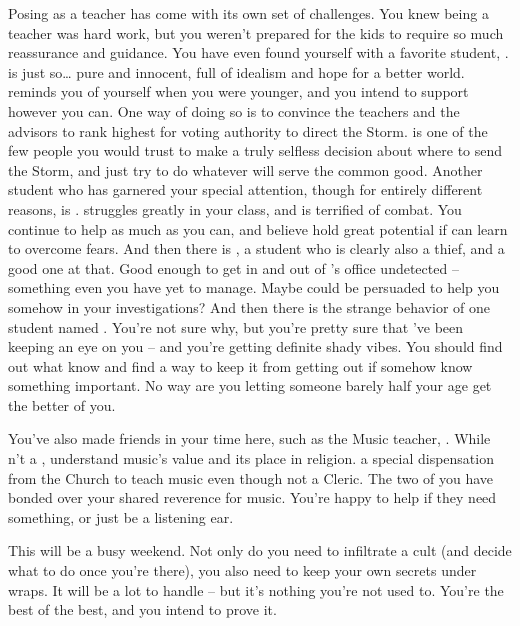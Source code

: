 \documentclass[char]{GL2020}
\begin{document}
Posing as a teacher has come with its own set of challenges. You knew being a teacher was hard work, but you weren't prepared for the kids to require so much reassurance and guidance. You have even found yourself with a favorite student, \cDisney{\full}. \cDisney{} is just so\ldots{} pure and innocent, full of idealism and hope for a better world. \cDisney{\They} reminds you of yourself when you were younger, and you intend to support \cDisney{\them} however you can. One way of doing so is to convince the \pTech{} teachers and the \pFarm{} advisors to rank \cDisney{} highest for voting authority to direct the Storm. \cDisney{} is one of the few people you would trust to make a truly selfless decision about where to send the Storm, and just try to do whatever will serve the common good. Another student who has garnered your special attention, though for entirely different reasons, is \cAdopted{\full}. \cAdopted{} struggles greatly in your class, and is terrified of combat. You continue to help \cAdopted{\them} as much as you can, and believe \cAdopted{\they} hold great potential if \cAdopted{\they} can learn to overcome \cAdopted{\their} fears. And then there is \cPirateChild{\full}, a student who is clearly also a thief, and a good one at that. Good enough to get in and out of \cChupInventor{}'s office undetected -- something even you have yet to manage. Maybe \cPirateChild{} could be persuaded to help you somehow in your investigations? And then there is the strange behavior of one \pFarm{} student named \cLibAssist{\full}. You're not sure why, but you're pretty sure that \cLibAssist{\they}'ve been keeping an eye on you -- and you're getting definite shady vibes. You should find out what \cLibAssist{\they} know\cLibAssist{\plural} and find a way to keep it from getting out if \cLibAssist{} somehow know\cLibAssist{\plural} something important. No way are you letting someone barely half your age get the better of you.

You've also made friends in your time here, such as the Music teacher, \cMusic{\full}. While \cMusic{\theyare}n't a \cMusic{\cleric} \cMusic{\themself}, \cMusic{\they} understand\cMusic{\plural} music's value and its place in religion. \cMusic{\They} \cMusic{\have} a special dispensation from the Church to teach music even though \cMusic{\theyare} not a Cleric. The two of you have bonded over your shared reverence for music. You're happy to help \cMusic{\them} if they need something, or just be a listening ear.

This will be a busy weekend. Not only do you need to infiltrate a cult (and decide what to do once you're there), you also need to keep your own secrets under wraps. It will be a lot to handle -- but it's nothing you're not used to. You're the best of the best, and you intend to prove it.
\end{document}
